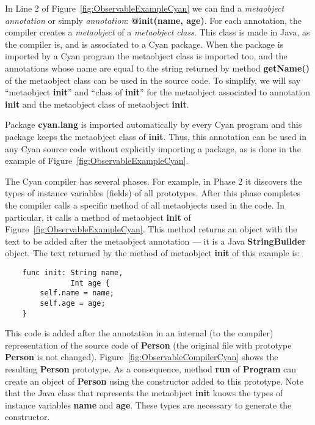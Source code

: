 \documentclass[preprint,review]{elsarticle}
\newcommand{\srcstyle}[1]{\ttfamily\textbf{#1}\rmfamily}
\begin{document}
In  Line 2  of  Figure~\ref{fig:ObservableExampleCyan} we  can find  a
\textit{metaobject   annotation}    or   simply   \textit{annotation}:
\srcstyle{@init(name, age)}. For each annotation, the compiler creates
a \textit{metaobject}  of a  \textit{metaobject class}. This  class is
made  in  Java, as  the  compiler  is, and  is  associated  to a  Cyan
package.  When  the  package  is  imported  by  a  Cyan  program  the
metaobject class is imported too, and the annotations whose name are
equal to  the string  returned by  method \srcstyle{getName()}  of the
metaobject class can be used in  the source code. To simplify, we will
say  ``metaobject \srcstyle{init}''  and ``class  of \srcstyle{init}''
for the  metaobject associated  to annotation \srcstyle{init}  and the
metaobject class of metaobject \srcstyle{init}.

Package \srcstyle{cyan.lang}  is imported automatically by  every Cyan
program and this package keeps the metaobject class of \srcstyle{init}. Thus, this annotation can be used in any Cyan source code without explicitly importing a package, as is done in
the example of Figure~\ref{fig:ObservableExampleCyan}.




The  Cyan compiler  has several  phases. For  example, in  Phase 2  it
discovers   the  types   of   instance  variables   (fields)  of   all
prototypes. After this phase completes the compiler calls a specific method of
all metaobjects used in the code.  In particular, it calls a method of
metaobject                      \srcstyle{init}                     of
Figure~\ref{fig:ObservableExampleCyan}. This method  returns an object
with the text to be added after  the metaobject annotation --- it is a
Java \srcstyle{StringBuilder} object. The  text returned by the method
of metaobject \srcstyle{init} of this example is:
\begin{lstlisting}
    func init: String name,
               Int age {
        self.name = name;
        self.age = age;
    }
\end{lstlisting}
This code  is added after the  annotation in an  internal (to  the compiler)
representation of  the source code of  \srcstyle{Person} (the original
file   with  prototype   \srcstyle{Person}  is   not  changed).
Figure~\ref{fig:ObservableCompilerCyan} shows the resulting
\srcstyle{Person} prototype.  As a consequence,  method \srcstyle{run}
of \srcstyle{Program}  can create an object  of \srcstyle{Person} using
the constructor added to this prototype.
Note that the Java class that represents the metaobject \srcstyle{init} knows the types of instance variables \srcstyle{name} and \srcstyle{age}. These types are necessary to generate the constructor.
\end{document}
